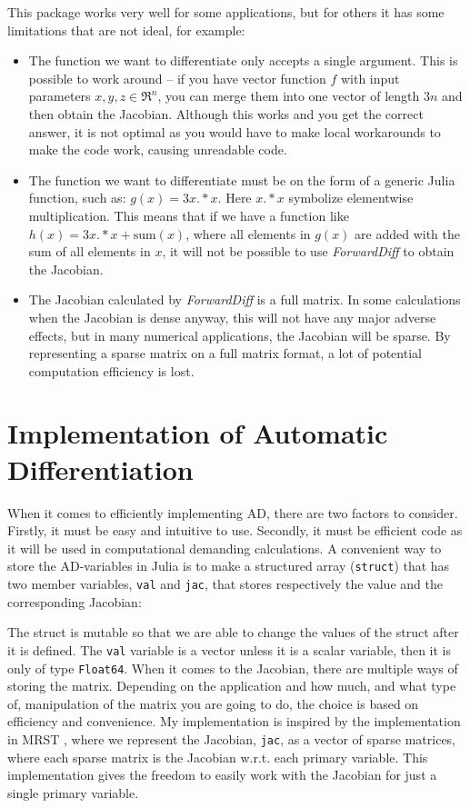  This package works very well for some applications, but for others it has some limitations that are not ideal, for example: 
\begin{itemize}
    \item The function we want to differentiate only accepts a single argument. This is possible to work around -- if you have vector function $f$ with input parameters $x,y,z \in \Re^n$, you can merge them into one vector of length $3n$ and then obtain the Jacobian. Although this works and you get the correct answer, it is not optimal as you would have to make local workarounds to make the code work, causing unreadable code.
    \item The function we want to differentiate must be on the form of a generic Julia function, such as: $g(x) = 3x.*x$. Here $x.*x$ symbolize elementwise multiplication. This means that if we have a function like $h(x) = 3x.*x + \text{sum}(x)$, where all elements in $g(x)$ are added with the sum of all elements in $x$, it will not be possible to use \textit{ForwardDiff} to obtain the Jacobian.
    \item The Jacobian calculated by \textit{ForwardDiff} is a full matrix. In some calculations when the Jacobian is dense anyway, this will not have any major adverse effects, but in many numerical applications, the Jacobian will be sparse. By representing a sparse matrix on a full matrix format, a lot of potential computation efficiency is lost.
\end{itemize}

\section{Implementation of Automatic Differentiation}
\label{sec:ImplementationAD}
When it comes to efficiently implementing AD, there are two factors to consider. Firstly, it must be easy and intuitive to use. Secondly, it must be efficient code as it will be used in computational demanding calculations. A convenient way to store the AD-variables in Julia is to make a structured array (\texttt{struct}) that has two member variables, \texttt{val} and \texttt{jac}, that stores respectively the value and the corresponding Jacobian: 
 
The struct is mutable so that we are able to change the values of the struct after it is defined. The \texttt{val} variable is a vector unless it is a scalar variable, then it is only of type  \texttt{Float64}. When it comes to the Jacobian, there are multiple ways of storing the matrix. Depending on the application and how much, and what type of, manipulation of the matrix you are going to do, the choice is based on efficiency and convenience. My implementation is inspired by the implementation in MRST \emph{\citep{lieMrstUrl}}, where we represent the Jacobian, \texttt{jac}, as a vector of sparse matrices, where each sparse matrix is the Jacobian w.r.t. each primary variable. This implementation gives the freedom to easily work with the Jacobian for just a single primary variable.

